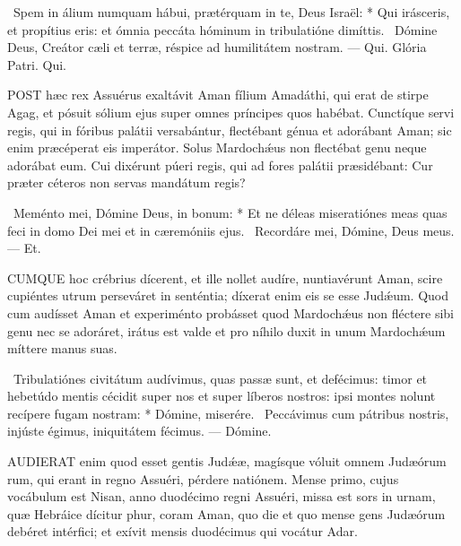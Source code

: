 \R\ Spem in álium numquam hábui, prætérquam in te, Deus Israël: * Qui irásceris, et propítius eris: et ómnia peccáta hóminum in tribulatióne dimíttis. \V\ Dómine Deus, Creátor cæli et terræ, réspice ad humilitátem nostram. — Qui. Glória Patri. Qui.




\lettrine[lines=2]{P}{OST} hæc rex Assuérus exaltávit Aman fílium Amadáthi, qui erat de stirpe Agag, et pósuit sólium ejus super omnes príncipes quos habébat. Cunctíque servi regis, qui in fóribus palátii versabántur, flectébant génua et adorábant Aman; sic enim præcéperat eis imperátor. Solus Mardochǽus non flectébat genu neque adorábat eum. Cui dixérunt púeri regis, qui ad fores palátii præsidébant: Cur præter céteros non servas mandátum regis?

\R\ Meménto mei, Dómine Deus, in bonum: * Et ne déleas miseratiónes meas quas feci in domo Dei mei et in cæremóniis ejus. \V\ Recordáre mei, Dómine, Deus meus. — Et.


\lettrine[lines=2]{C}{UMQUE} hoc crébrius dícerent, et ille nollet audíre, nuntiavérunt Aman, scire cupiéntes utrum perseváret in senténtia; díxerat enim eis se esse Judǽum. Quod cum audísset Aman et experiménto probásset quod Mardochǽus non fléctere sibi genu nec se adoráret, irátus est valde et pro níhilo duxit in unum Mardochǽum míttere manus suas.

\R\ Tribulatiónes civitátum audívimus, quas passæ sunt, et defécimus: timor et hebetúdo mentis cécidit super nos et super líberos nostros: ipsi montes nolunt recípere fugam nostram: * Dómine, miserére. \V\ Peccávimus cum pátribus nostris, injúste égimus, iniquitátem fécimus. — Dómine.



\lettrine[lines=2]{A}{UDIERAT} enim quod esset gentis Judǽæ, magísque vóluit omnem Judæórum rum, qui erant in regno Assuéri, pérdere natiónem. Mense primo, cujus vocábulum est Nisan, anno duodécimo regni Assuéri, missa est sors in urnam, quæ Hebráice dícitur phur, coram Aman, quo die et quo mense gens Judæórum debéret intérfici; et exívit mensis duodécimus qui vocátur Adar.

